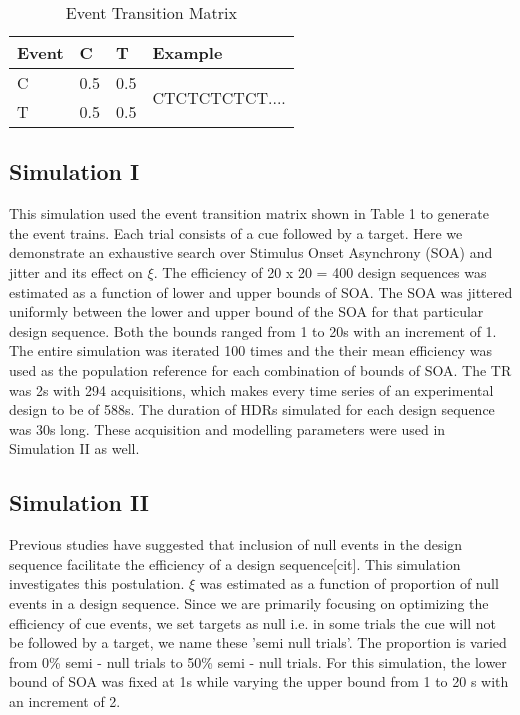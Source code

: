 \documentclass[11pt]{article}
\begin{document}
\begin{table}[t]
\centering
\caption{Event Transition Matrix}
\begin{tabular}{llll} 
\hline
Event & C   & T   & Example                          \\ 
\hline
C     & 0.5 & 0.5 & \multirow{2}{*}{CTCTCTCTCT....}  \\
T     & 0.5 & 0.5 &                                  \\
\hline
\end{tabular}
\end{table}

\subsection{Simulation I}
This simulation used the event transition matrix shown in Table 1 to generate the event trains. Each trial consists of a cue followed by a target. Here we demonstrate an exhaustive search over Stimulus Onset Asynchrony (SOA) and jitter and its effect on $\xi$. The efficiency of 20 x 20 = 400 design sequences was estimated as a function of lower and upper bounds of SOA. The SOA was jittered uniformly between the lower and upper bound of the SOA for that particular design sequence. Both the bounds ranged from 1 to 20s with an increment of 1. The entire simulation was iterated 100 times and the their mean efficiency was used as the population reference for each combination of bounds of SOA. The TR was 2s with 294 acquisitions, which makes every time series of an experimental design to be of 588s. The duration of HDRs simulated for each design sequence was 30s long. These acquisition and modelling parameters were used in Simulation II as well.

\subsection{Simulation II}
Previous studies have suggested that inclusion of null events in the design sequence facilitate the efficiency of a design sequence[cit]. This simulation investigates this postulation. $\xi$ was estimated as a function of proportion of null events in a design sequence. Since we are primarily focusing on optimizing the efficiency of cue events, we set targets as null i.e. in some trials the cue will not be followed by a target, we name these 'semi null trials'. The proportion is varied from 0\%  semi - null trials to 50\% semi - null trials. For this simulation, the lower bound of SOA was fixed at 1s while varying the upper bound from 1 to 20 s with an increment of 2.
\end{document}
